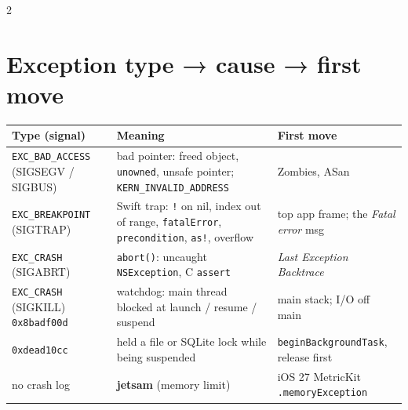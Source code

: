 \documentclass[8pt]{extarticle}
\begin{document}
\begin{multicols}{2}
\raggedright

\section{Exception type → cause → first move}
{\footnotesize
\begin{tabular}{@{}>{\raggedright\arraybackslash}p{21mm}>{\raggedright\arraybackslash}p{32mm}>{\raggedright\arraybackslash}p{22mm}@{}}
\toprule
\textbf{Type (signal)} & \textbf{Meaning} & \textbf{First move} \\
\midrule
\texttt{EXC\_BAD\_ACCESS} (SIGSEGV / SIGBUS) & bad pointer: freed object, \texttt{unowned}, unsafe pointer; \texttt{KERN\_INVALID\_ADDRESS} & Zombies, ASan \\
\texttt{EXC\_BREAKPOINT} (SIGTRAP) & Swift trap: \texttt{!} on nil, index out of range, \texttt{fatalError}, \texttt{precondition}, \texttt{as!}, overflow & top app frame; the \emph{Fatal error} msg \\
\texttt{EXC\_CRASH} (SIGABRT) & \texttt{abort()}: uncaught \texttt{NSException}, C \texttt{assert} & \emph{Last Exception Backtrace} \\
\texttt{EXC\_CRASH} (SIGKILL) \texttt{0x8badf00d} & watchdog: main thread blocked at launch / resume / suspend & main stack; I/O off main \\
\texttt{0xdead10cc} & held a file or SQLite lock while being suspended & \texttt{beginBackgroundTask}, release first \\
no crash log & \textbf{jetsam} (memory limit) & iOS 27 MetricKit \texttt{.memoryException} \\
\bottomrule
\end{tabular}}


\end{multicols}
\end{document}
